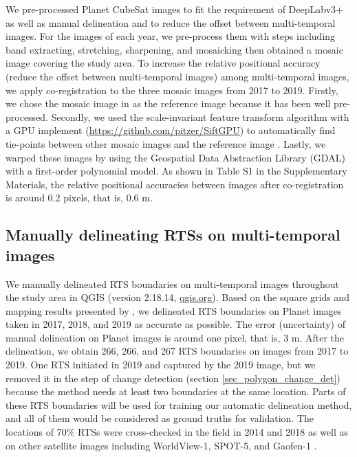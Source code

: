 \documentclass[authoryear,preprint,review,12pt]{elsarticle}
\begin{document}
We pre-processed Planet CubeSat images to fit the requirement of DeepLabv3+ as well as manual delineation and to reduce the offset between multi-temporal images. 
For the images of each year, we pre-process them with steps including band extracting, stretching, sharpening, and mosaicking then obtained a mosaic image covering the study area. 
To increase the relative positional accuracy (reduce the offset between multi-temporal images) among multi-temporal images, we apply co-registration to the three mosaic images from 2017 to 2019. 
Firstly, we chose the mosaic image in \cite{huang2020using} as the reference image because it has been well pre-processed. 
Secondly, we used the scale-invariant feature transform algorithm \citep{lowe2004distinctive} with a GPU implement (\url{https://github.com/pitzer/SiftGPU}) to automatically find tie-points between other mosaic images and the reference image \citep{huang2016a}. 
Lastly, we warped these images by using the Geospatial Data Abstraction Library (GDAL) with a first-order polynomial model.
As shown in Table S1 in the Supplementary Materials, the relative positional accuracies between images after co-registration is around 0.2 pixels, that is, 0.6 m. 



\subsection{Manually delineating RTSs on multi-temporal images}
\label{sec_manu_delineating}

We manually delineated RTS boundaries on multi-temporal images throughout the study area in QGIS (version 2.18.14, \url{qgis.org}). 
Based on the square grids and mapping results presented by \cite{huang2020using}, we delineated RTS boundaries on Planet images taken in 2017, 2018, and 2019 as accurate as possible. 
The error (uncertainty) of manual delineation on Planet images is around one pixel, that is, 3 m. 
After the delineation, we obtain 266, 266, and 267 RTS boundaries on images from 2017 to 2019. 
One RTS initiated in 2019 and captured by the 2019 image, but we removed it in the step of change detection (section \ref{sec_polygon_change_det}) because the method needs at least two boundaries at the same location. 
Parts of these RTS boundaries will be used for training our automatic delineation method, and all of them would be considered as ground truths for validation. 
The locations of 70\% RTSs were cross-checked in the field in 2014 and 2018 as well as on other satellite images including WorldView-1, SPOT-5, and Gaofen-1 \citep{luo2019recent}. 
%
\end{document}
